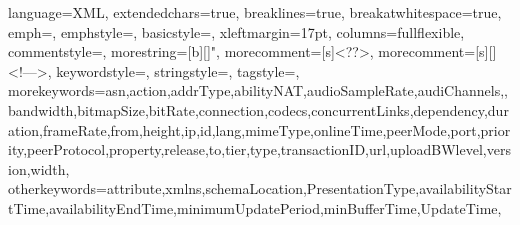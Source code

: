 \newcommand{\fancychapter}[1]{%
    \chapter{#1}%
}
%
\newcommand{\hlinew}[1]{%
  \noalign{\ifnum0=`}\fi\hrule \@height #1 \futurelet
   \reserved@a\@xhline}
%
\def\Mark#1{\raisebox{0pt}[0pt][0pt]{\textsuperscript{\footnotesize\ensuremath{\ifcase#1\or *\or \dagger\or \ddagger\or%
    \mathsection\or \mathparagraph\or \|\or **\or \dagger\dagger%
    \or \ddagger\ddagger \else\textsuperscript{\expandafter\romannumeral#1}\fi}}}}
%
 {
    language=XML,
    extendedchars=true,
    breaklines=true,
    breakatwhitespace=true,
    emph={},
    emphstyle=\color{red},
    basicstyle=\small,
    xleftmargin=17pt,
    columns=fullflexible,
    commentstyle=\color{gray}\upshape,
    morestring=[b][\color{brown}]",
    morecomment=[s]{<?}{?>},
    morecomment=[s][\color{forestgreen}]{<!--}{-->},
    keywordstyle=\color{orangered},
    stringstyle=\ttfamily\color{black},
    tagstyle=\color{blue},
    morekeywords={asn,action,addrType,abilityNAT,audioSampleRate,audiChannels,,bandwidth,bitmapSize,bitRate,connection,codecs,concurrentLinks,dependency,duration,frameRate,from,height,ip,id,lang,mimeType,onlineTime,peerMode,port,priority,peerProtocol,property,release,to,tier,type,transactionID,url,uploadBWlevel,version,width},
    otherkeywords={attribute,xmlns,schemaLocation,PresentationType,availabilityStartTime,availabilityEndTime,minimumUpdatePeriod,minBufferTime,UpdateTime},
}
